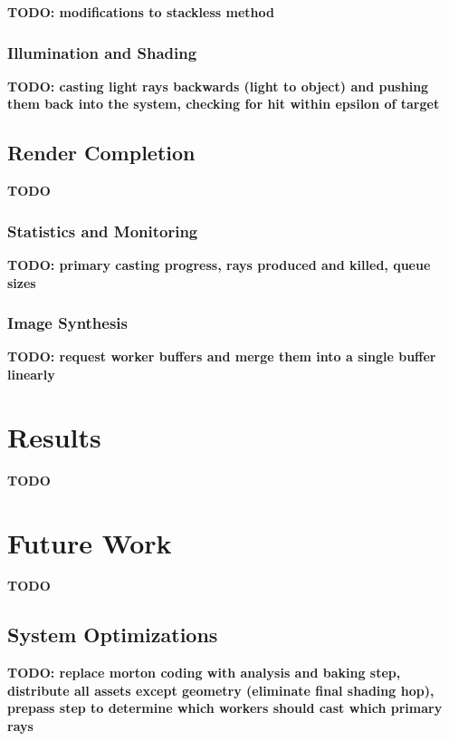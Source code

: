 \documentclass[12pt]{ucthesis}
\begin{document}
\textbf{TODO: modifications to stackless method}

\subsection{Illumination and Shading}
\label{shading}

\textbf{TODO: casting light rays backwards (light to object) and pushing them back into the system, checking for hit within epsilon of target}

\section{Render Completion}
\label{completion}

\textbf{TODO}

\subsection{Statistics and Monitoring}
\label{stats}

\textbf{TODO: primary casting progress, rays produced and killed, queue sizes}

\subsection{Image Synthesis}
\label{synthesis}

\textbf{TODO: request worker buffers and merge them into a single buffer linearly}

\chapter{Results}
\label{results}

\textbf{TODO}

\chapter{Future Work}
\label{futurework}

\textbf{TODO}

\section{System Optimizations}
\label{optimizations}

\textbf{TODO: replace morton coding with analysis and baking step, distribute all assets except geometry (eliminate final shading hop), prepass step to determine which workers should cast which primary rays}
\end{document}
